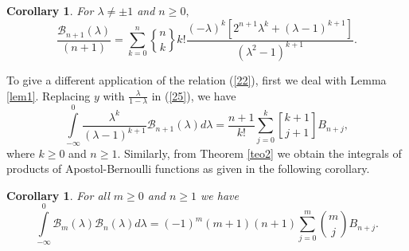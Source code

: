 \documentclass{article}%
\newtheorem{corollary}[theorem]{Corollary}
\begin{document}
\begin{corollary}
For $\lambda\neq\pm1$ and $n\geq0,$%
\[
\frac{\mathcal{B}_{n+1}\left(  \lambda\right)  }{\left(  n+1\right)  }%
=\sum_{k=0}^{n}%
\genfrac{\{}{\}}{0pt}{}{n}{k}%
k!\frac{\left(  -\lambda\right)  ^{k}\left[  2^{n+1}\lambda^{k}+\left(
\lambda-1\right)  ^{k+1}\right]  }{\left(  \lambda^{2}-1\right)  ^{k+1}}.
\]

\end{corollary}

To give a different application of the relation (\ref{22}), first we deal with
Lemma \ref{lem1}. Replacing $y$ with $\frac{\lambda}{1-\lambda}$ in
(\ref{25}), we have
\[%
{\displaystyle\int\limits_{-\infty}^{0}}
\frac{\lambda^{k}}{\left(  \lambda-1\right)  ^{k+1}}\mathcal{B}_{n+1}\left(
\lambda\right)  d\lambda=\frac{n+1}{k!}\sum_{j=0}^{k}%
\genfrac{[}{]}{0pt}{}{k+1}{j+1}%
B_{n+j},
\]
where $k\geq0$ and $n\geq1.$ Similarly, from Theorem \ref{teo2} we obtain the
integrals of products of Apostol-Bernoulli functions as given in the following corollary.

\begin{corollary}
For all $m\geq0$ and $n\geq1$ we have
\[%
{\displaystyle\int\limits_{-\infty}^{0}}
\mathcal{B}_{m}\left(  \lambda\right)  \mathcal{B}_{n}\left(  \lambda\right)
d\lambda=(-1)^{m}\left(  m+1\right)  \left(  n+1\right)  \sum_{j=0}^{m}%
\binom{m}{j}B_{n+j}.
\]

\end{corollary}
\end{document}
